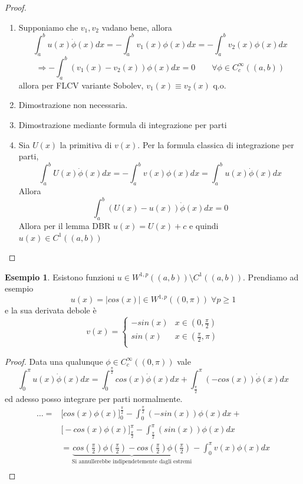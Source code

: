 \documentclass[a4paper]{book}
\theoremstyle{definition}
\newtheorem{ex}{Esempio}
\theoremstyle{remark}
\theoremstyle{definition}
\newcommand{\ra}{\Rightarrow}
\begin{document}
\begin{proof}
	\begin{enumerate}
		\item Supponiamo che $v_1, v_2$ vadano bene, allora 
		$$\int_a^b u(x)\dot{\phi}(x) dx = - \int_a^b v_1(x)\phi(x)dx = - \int_a^b v_2(x)\phi(x)dx$$
		$$\ra - \int_a^b (v_1(x) - v_2(x))\phi(x)dx = 0 \qquad \forall \phi \in C^\infty_c((a,b)) $$
		allora per FLCV variante Sobolev, $v_1(x) \equiv v_2(x)$ q.o.
		\item Dimostrazione non necessaria.
		\item Dimostrazione mediante formula di integrazione per parti
		\item Sia $U(x)$ la primitiva di $v(x)$. Per la formula classica di integrazione per parti, $$\int_a^b U(x)\dot{\phi}(x) dx = - \int_a^b v(x)\phi(x)dx = \int_a^b u(x)\dot{\phi}(x) dx$$
		Allora $$\int_a^b (U(x) - u(x))\dot{\phi}(x) dx = 0$$
		Allora per il lemma DBR $u(x) = U(x)+c$ e quindi $u(x)\in C^1((a,b))$
	\end{enumerate}
\end{proof}

\begin{ex}
	Esistono funzioni $u \in W^{1,p}((a,b))\setminus C^1((a,b))$. Prendiamo ad esempio $$u(x) = |cos(x)| \in W^{1, p}((0, \pi)) \; \forall p \ge 1$$ e la sua derivata debole è 
	$$
	v(x) = 
	\begin{cases}
		-sin(x) & x \in (0, \frac\pi2) \\
		sin(x) & x \in (\frac\pi2, \pi) \\
	\end{cases}
	$$
\end{ex}

\begin{proof}
	Data una qualunque $\phi \in C^\infty_c((0, \pi))$ vale $$\int_0^\pi u(x)\dot{\phi}(x)dx = \int_0^{\frac\pi2}cos(x)\dot{\phi}(x)dx + \int_{\frac\pi2}^\pi (-cos(x))\dot{\phi}(x)dx$$
	ed adesso posso integrare per parti normalmente.
	\[
	\begin{aligned}
		\dots  = & \big[ cos(x) \phi(x) \big]_0^{\frac\pi2} - \int_0^\frac\pi2 (-sin(x))\phi(x)dx + \\
		& \big[ -cos(x) \phi(x) \big]_{\frac\pi2}^\pi - \int_\frac\pi2^\pi (sin(x))\phi(x)dx \\
		& = \underbrace{cos(\frac\pi2)\phi(\frac\pi2) - cos(\frac\pi2)\phi(\frac\pi2)}_{\text{Si annullerebbe indipendetemente dagli estremi}} - \int_0^\pi v(x)\phi(x) dx\\ 
	\end{aligned}
	\]
\end{proof}
\end{document}
